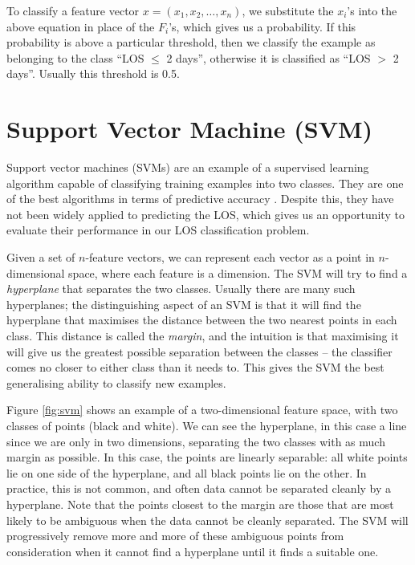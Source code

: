 To classify a feature vector $x = (x_1,x_2,\ldots,x_n)$, we substitute the
$x_i$'s into the above equation in place of the $F_i$'s, which gives us a
probability. If this probability is above a particular threshold, then we
classify the example as belonging to the class ``LOS $\leq$ 2 days'', otherwise
it is classified as ``LOS $>$ 2 days''. Usually this threshold is 0.5.

\section{Support Vector Machine (SVM)}
Support vector machines (SVMs) are an example of a supervised learning algorithm
capable of classifying training examples into two classes. They are one of the
best algorithms in terms of predictive accuracy \cite{Bellazzi2008}. Despite
this, they have not been widely applied to predicting the LOS, which gives us
an opportunity to evaluate their performance in our LOS classification problem.

Given a set of $n$-feature vectors, we can represent each vector as a point in
$n$-dimensional space, where each feature is a dimension. The SVM will try to
find a \textit{hyperplane} that separates the two classes. Usually there are
many such hyperplanes; the distinguishing aspect of an SVM is that it will
find the hyperplane that maximises the distance between the two nearest points
in each class. This distance is called the \textit{margin}, and the intuition
is that maximising it will give us the greatest possible separation between the
classes -- the classifier comes no closer to either class than it needs to.
This gives the SVM the best generalising ability to classify new examples.

Figure \ref{fig:svm} shows an example of a two-dimensional feature space, with
two classes of points (black and white). We can see the hyperplane, in this
case a line since we are only in two dimensions, separating the two classes
with as much margin as possible. In
this case, the points are linearly separable: all white points lie on one side
of the hyperplane, and all black points lie on the other. In practice, this is
not common, and often data cannot be separated cleanly by a hyperplane.
Note that the points closest to the margin are those that are most likely to be
ambiguous when the data cannot be cleanly separated. The SVM will progressively
remove more and more of these ambiguous points from consideration when it
cannot find a hyperplane until it finds a suitable one.

